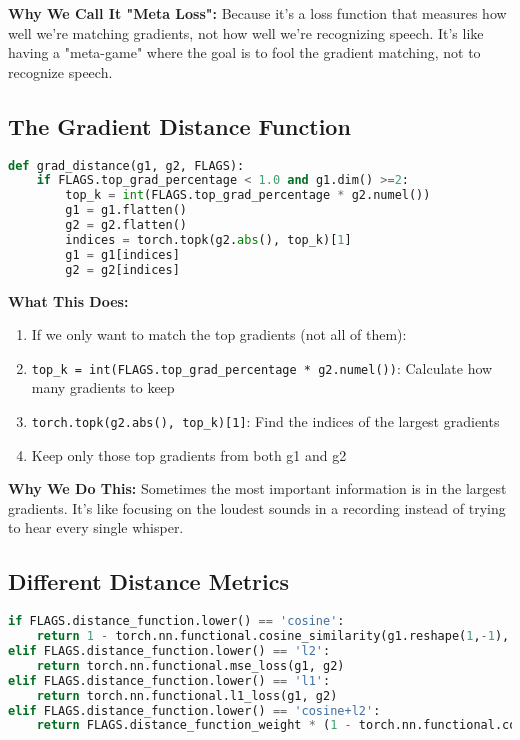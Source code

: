\documentclass[12pt]{article}
\begin{document}
\textbf{Why We Call It "Meta Loss":}
Because it's a loss function that measures how well we're matching gradients, not how well we're recognizing speech. It's like having a "meta-game" where the goal is to fool the gradient matching, not to recognize speech.

\subsection{The Gradient Distance Function}

\begin{lstlisting}[language=Python, basicstyle=\small]
def grad_distance(g1, g2, FLAGS):
    if FLAGS.top_grad_percentage < 1.0 and g1.dim() >=2:
        top_k = int(FLAGS.top_grad_percentage * g2.numel())
        g1 = g1.flatten()
        g2 = g2.flatten()
        indices = torch.topk(g2.abs(), top_k)[1] 
        g1 = g1[indices]
        g2 = g2[indices]
\end{lstlisting}

\textbf{What This Does:}
\begin{enumerate}
    \item If we only want to match the top gradients (not all of them):
    \item \texttt{top\_k = int(FLAGS.top\_grad\_percentage * g2.numel())}: Calculate how many gradients to keep
    \item \texttt{torch.topk(g2.abs(), top\_k)[1]}: Find the indices of the largest gradients
    \item Keep only those top gradients from both g1 and g2
\end{enumerate}

\textbf{Why We Do This:}
Sometimes the most important information is in the largest gradients. It's like focusing on the loudest sounds in a recording instead of trying to hear every single whisper.

\subsection{Different Distance Metrics}

\begin{lstlisting}[language=Python, basicstyle=\small]
if FLAGS.distance_function.lower() == 'cosine':
    return 1 - torch.nn.functional.cosine_similarity(g1.reshape(1,-1), g2.reshape(1,-1))
elif FLAGS.distance_function.lower() == 'l2':
    return torch.nn.functional.mse_loss(g1, g2)
elif FLAGS.distance_function.lower() == 'l1':
    return torch.nn.functional.l1_loss(g1, g2)
elif FLAGS.distance_function.lower() == 'cosine+l2':
    return FLAGS.distance_function_weight * (1 - torch.nn.functional.cosine_similarity(g1.reshape(1,-1), g2.reshape(1,-1))) + (1- FLAGS.distance_function_weight) * torch.nn.functional.mse_loss(g1, g2)
\end{lstlisting}
\end{document}
